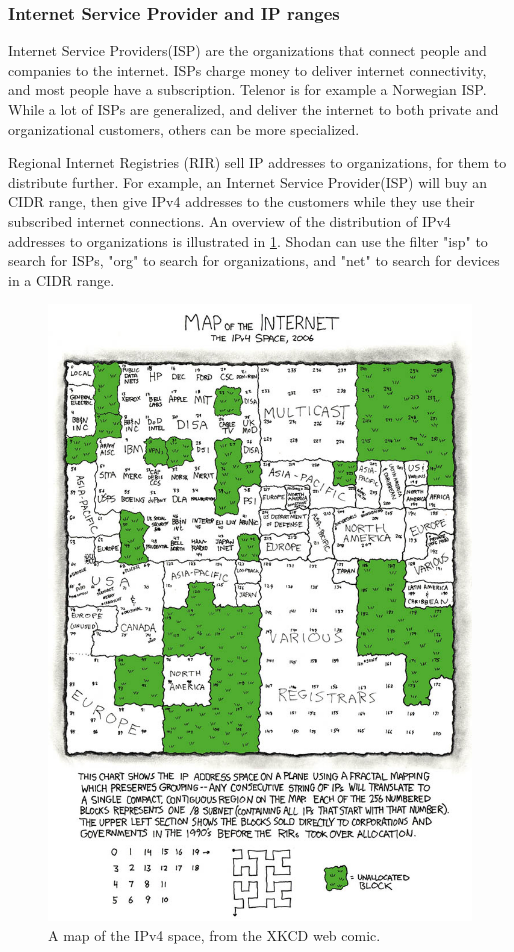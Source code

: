 \subsubsection{Internet Service Provider and IP ranges} \label{sec:isp_method}
Internet Service Providers(ISP) are the organizations that connect people and companies to the internet. ISPs charge money to deliver internet connectivity, and most people have a subscription. Telenor is for example a Norwegian ISP. While a lot of ISPs are generalized, and deliver the internet to both private and organizational customers, others can be more specialized. 

Regional Internet Registries (RIR) sell IP addresses to organizations, for them to distribute further. For example, an Internet Service Provider(ISP) will buy an CIDR range, then give IPv4 addresses to the customers while they use their subscribed internet connections. An overview of the distribution of IPv4 addresses to organizations is illustrated in \cref{fig:ipv4_map}. Shodan can use the filter "isp" to search for ISPs, "org" to search for organizations, and "net" to search for devices in a CIDR range. 

\begin{figure} [H]
    \centering
    \includegraphics[scale=4]{Figurer/map_of_the_internet.jpg}
    \caption{A map of the IPv4 space, from the XKCD web comic. \cite{xkcd} }
    \label{fig:ipv4_map}
\end{figure}

